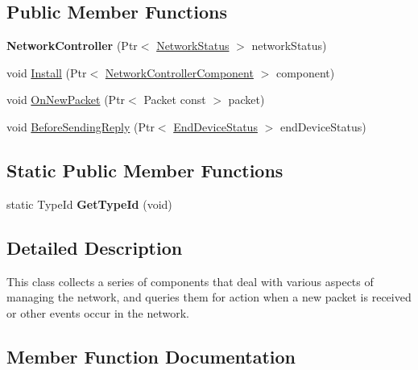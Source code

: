 \subsection*{Public Member Functions}
\begin{DoxyCompactItemize}
\item 
\mbox{\label{classns3_1_1lorawan_1_1NetworkController_abc2ab549706744f8b13197eb69c17eb8}} 
{\bfseries Network\+Controller} (Ptr$<$ \hyperlink{classns3_1_1lorawan_1_1NetworkStatus}{Network\+Status} $>$ network\+Status)
\item 
void \hyperlink{classns3_1_1lorawan_1_1NetworkController_a39dd06a8108bd9eb19961c2b050d47db}{Install} (Ptr$<$ \hyperlink{classns3_1_1lorawan_1_1NetworkControllerComponent}{Network\+Controller\+Component} $>$ component)
\item 
void \hyperlink{classns3_1_1lorawan_1_1NetworkController_af2192cd404ae5c1588c4375e4396e9ef}{On\+New\+Packet} (Ptr$<$ Packet const $>$ packet)
\item 
void \hyperlink{classns3_1_1lorawan_1_1NetworkController_a7d2aeeeb810d22ffb7206efd98986a79}{Before\+Sending\+Reply} (Ptr$<$ \hyperlink{classns3_1_1lorawan_1_1EndDeviceStatus}{End\+Device\+Status} $>$ end\+Device\+Status)
\end{DoxyCompactItemize}
\subsection*{Static Public Member Functions}
\begin{DoxyCompactItemize}
\item 
\mbox{\label{classns3_1_1lorawan_1_1NetworkController_aab1bd4972edc79a21291955ad289fd94}} 
static Type\+Id {\bfseries Get\+Type\+Id} (void)
\end{DoxyCompactItemize}


\subsection{Detailed Description}
This class collects a series of components that deal with various aspects of managing the network, and queries them for action when a new packet is received or other events occur in the network. 

\subsection{Member Function Documentation}
\mbox{\label{classns3_1_1lorawan_1_1NetworkController_a7d2aeeeb810d22ffb7206efd98986a79}} 
